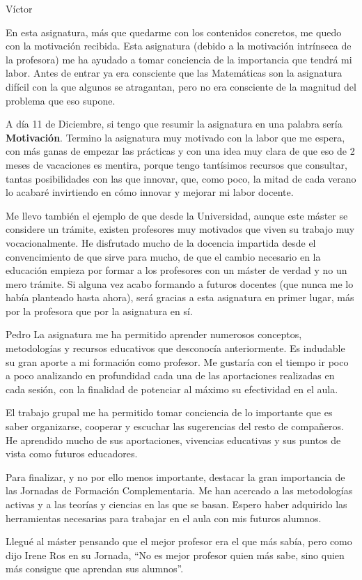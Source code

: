 \begin{opin}{\victorcolor}{Víctor}

En esta asignatura, más que quedarme con los contenidos concretos, me quedo con la motivación recibida.
%
Esta asignatura (debido a la motivación intrínseca de la profesora) me ha ayudado a tomar conciencia de la importancia que tendrá mi labor. 
%
Antes de entrar ya era consciente que las Matemáticas son la asignatura difícil con la que algunos se atragantan, pero no era consciente de la magnitud del problema que eso supone.

A día 11 de Diciembre, si tengo que resumir la asignatura en una palabra sería \textbf{Motivación}. 
%
Termino la asignatura muy motivado con la labor que me espera, con más ganas de empezar las prácticas y con una idea muy clara de que eso de 2 meses de vacaciones es mentira, porque tengo tantísimos recursos que consultar, tantas posibilidades con las que innovar, que, como poco, la mitad de cada verano lo acabaré invirtiendo en cómo innovar y mejorar mi labor docente.

Me llevo también el ejemplo de que desde la Universidad, aunque este máster se considere un trámite, existen profesores muy motivados que viven su trabajo muy vocacionalmente. 
%
He disfrutado mucho de la docencia impartida desde el convencimiento de que sirve para mucho, de que el cambio necesario en la educación empieza por formar a los profesores con un máster de verdad y no un mero trámite. Si alguna vez acabo formando a futuros docentes (que nunca me lo había planteado hasta ahora), será gracias a esta asignatura en primer lugar, más por la profesora que por la asignatura en sí. 

\end{opin}


\begin{opin}{\pedrocolor}{Pedro}
La asignatura me ha permitido aprender numerosos conceptos, metodologías y recursos educativos que desconocía anteriormente. Es indudable su gran aporte a mi formación como profesor. Me gustaría con el tiempo ir poco a poco analizando en profundidad cada una de las aportaciones realizadas en cada sesión, con la finalidad de potenciar al máximo su efectividad en el aula. 

El trabajo grupal me ha permitido tomar conciencia de lo importante que es saber organizarse, cooperar y escuchar las sugerencias del resto de compañeros. He aprendido mucho de sus aportaciones, vivencias educativas y sus puntos de vista como futuros educadores.

Para finalizar, y no por ello menos importante, destacar la gran importancia de las Jornadas de Formación Complementaria. Me han acercado a las metodologías activas y a las teorías y ciencias en las que se basan. Espero haber adquirido las herramientas necesarias para trabajar en el aula con mis futuros alumnos. 

Llegué al máster pensando que el mejor profesor era el que más sabía, pero como dijo Irene Ros en su Jornada, “No es mejor profesor quien más sabe, sino quien más consigue que aprendan sus alumnos”.
\end{opin}